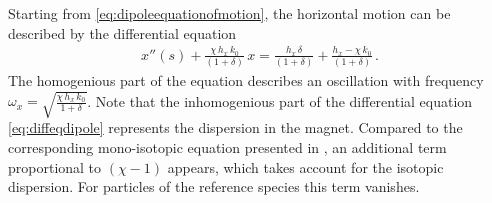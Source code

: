 Starting from \eqref{eq:dipoleequationofmotion}, the horizontal motion can be described by the differential equation
\begin{align}
x''(s) + \frac{\chi \, h_x \, k_0}{(1+\delta)} \, x = \frac{h_x \, \delta}{(1+\delta)} + \frac{h_x - \chi \, k_0}{(1+\delta)} \, . \label{eq:diffeqdipole}
\end{align}
%
The homogenious part of the equation describes an oscillation with frequency $\omega_x=\sqrt{\frac{\chi \, h_x \, k_0}{1+\delta}}$. Note that the inhomogenious part of the differential equation \eqref{eq:diffeqdipole} represents the dispersion in the magnet. Compared to the corresponding mono-isotopic equation presented in \cite{DESY-95-189}, an additional term proportional to $(\chi-1)$ appears, which takes account for the isotopic dispersion. For particles of the reference species this term vanishes. 
%

